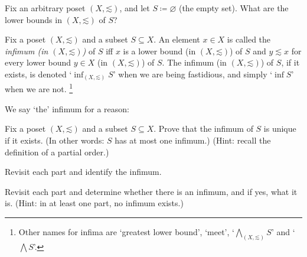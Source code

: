\begin{exercise}
	\label{exercise:lb_empty}
	Fix an arbitrary poset $(X,\mathord{\lesssim})$, and let $S \coloneqq \varnothing$ (the empty set). What are the lower bounds in $(X,\mathord{\lesssim})$ of $S$?
\end{exercise}

\begin{definition}
	\label{definition:glb}
	Fix a poset $(X,\mathord{\lesssim})$ and a subset $S \subseteq X$.
	An element $x \in X$ is called the \emph{infimum (in $(X,\mathord{\lesssim})$)} of $S$ iff $x$ is a lower bound (in $(X,\mathord{\lesssim})$) of $S$ and $y \lesssim x$ for every lower bound $y \in X$ (in $(X,\mathord{\lesssim})$) of $S$.
	The infimum (in $(X,\mathord{\lesssim})$) of $S$, if it exists, is denoted `$\inf_{(X,\mathord{\lesssim})} S$' when we are being fastidious, and simply `$\inf S$' when we are not.%
		\footnote{Other names for infima are `greatest lower bound', `meet', `$\bigwedge_{(X,\mathord{\lesssim})} S$' and `$\bigwedge S$'.}
\end{definition}

We say `the' infimum for a reason:

\begin{exercise}
	\label{exercise:glb_unique}
	Fix a poset $(X,\mathord{\lesssim})$ and a subset $S \subseteq X$. Prove that the infimum of $S$ is unique if it exists. (In other words: $S$ has at most one infimum.) (Hint: recall the definition of a partial order.)
\end{exercise}

\begin{namedthm}
	\label{exercise:lb-R-latt}
	Revisit each part and identify the infimum.
\end{namedthm}

\begin{namedthm}
	\label{exercise:lb_disj_latt}
	Revisit each part and determine whether there is an infimum, and if yes, what it is. (Hint: in at least one part, no infimum exists.)
\end{namedthm}

